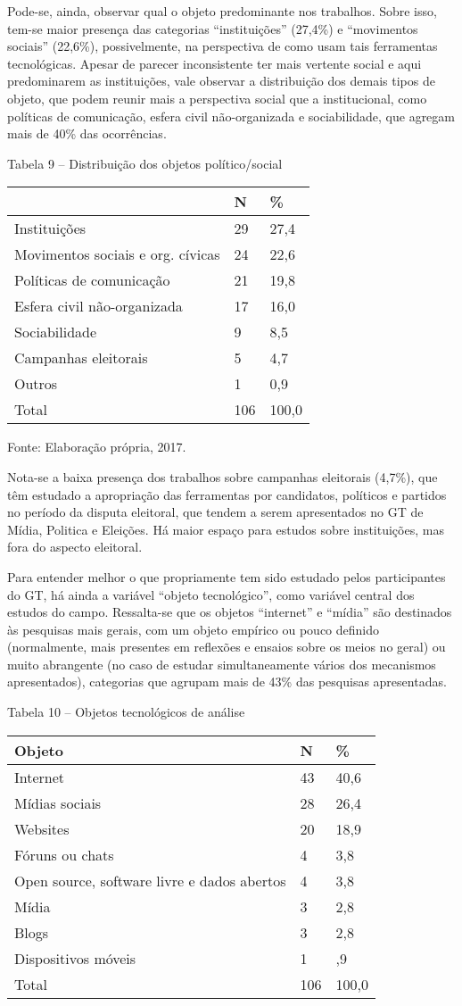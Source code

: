 Pode-se, ainda, observar qual o objeto predominante nos trabalhos. Sobre
isso, tem-se maior presença das categorias ``instituições'' (27,4\%) e
``movimentos sociais'' (22,6\%), possivelmente, na perspectiva de como
usam tais ferramentas tecnológicas. Apesar de parecer inconsistente ter
mais vertente social e aqui predominarem as instituições, vale observar
a distribuição dos demais tipos de objeto, que podem reunir mais a
perspectiva social que a institucional, como políticas de comunicação,
esfera civil não-organizada e sociabilidade, que agregam mais de 40\%
das ocorrências.

Tabela 9 -- Distribuição dos objetos político/social

\begin{longtable}[]{@{}lll@{}}
\toprule
~ & N & \%\tabularnewline
\midrule
\endhead
Instituições & 29 & 27,4\tabularnewline
Movimentos sociais e org. cívicas & 24 & 22,6\tabularnewline
Políticas de comunicação & 21 & 19,8\tabularnewline
Esfera civil não-organizada & 17 & 16,0\tabularnewline
Sociabilidade & 9 & 8,5\tabularnewline
Campanhas eleitorais & 5 & 4,7\tabularnewline
Outros & 1 & 0,9\tabularnewline
Total & 106 & 100,0\tabularnewline
\bottomrule
\end{longtable}

Fonte: Elaboração própria, 2017.

Nota-se a baixa presença dos trabalhos sobre campanhas eleitorais
(4,7\%), que têm estudado a apropriação das ferramentas por candidatos,
políticos e partidos no período da disputa eleitoral, que tendem a serem
apresentados no GT de Mídia, Politica e Eleições. Há maior espaço para
estudos sobre instituições, mas fora do aspecto eleitoral.

Para entender melhor o que propriamente tem sido estudado pelos
participantes do GT, há ainda a variável ``objeto tecnológico'', como
variável central dos estudos do campo. Ressalta-se que os objetos
``internet'' e ``mídia'' são destinados às pesquisas mais gerais, com um
objeto empírico ou pouco definido (normalmente, mais presentes em
reflexões e ensaios sobre os meios no geral) ou muito abrangente (no
caso de estudar simultaneamente vários dos mecanismos apresentados),
categorias que agrupam mais de 43\% das pesquisas apresentadas.

Tabela 10 -- Objetos tecnológicos de análise

\begin{longtable}[]{@{}lll@{}}
\toprule
Objeto & N & \%\tabularnewline
\midrule
\endhead
Internet & 43 & 40,6\tabularnewline
Mídias sociais & 28 & 26,4\tabularnewline
Websites & 20 & 18,9\tabularnewline
Fóruns ou chats & 4 & 3,8\tabularnewline
Open source, software livre e dados abertos & 4 & 3,8\tabularnewline
Mídia & 3 & 2,8\tabularnewline
Blogs & 3 & 2,8\tabularnewline
Dispositivos móveis & 1 & ,9\tabularnewline
Total & 106 & 100,0\tabularnewline
\bottomrule
\end{longtable}

